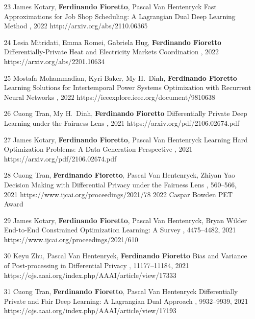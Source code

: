 \documentclass[localFont,alternative]{documentMETADATA}
\begin{document}
\begin{pubs}
	\confentryShort
	{23} %
	{{James Kotary}, {\bf Ferdinando Fioretto}, Pascal Van Hentenryck}
	{Fast Approximations for Job Shop Scheduling: A Lagrangian Dual Deep Learning Method}
	{\procAAAI, 2022}
	{http://arxiv.org/abs/2110.06365}

	\confentryShort
	{24} %
	{Lesia Mitridati, Emma Romei, Gabriela Hug, {\bf Ferdinando Fioretto}}
	{Differentially-Private Heat and Electricity Markets Coordination}
	{\procPMAPS, 2022}
	{https://arxiv.org/abs/2201.10634}

	\confentryShort
	{25} %
	{Mostafa Mohammadian, Kyri Baker, {My H.~Dinh}, {\bf Ferdinando Fioretto}}
	{Learning Solutions for Intertemporal Power Systems Optimization with Recurrent Neural Networks}
	{\procPMAPS, 2022}
	{https://ieeexplore.ieee.org/document/9810638}

	\confentryShort 
	{26} %
	{{Cuong Tran}, {My H.~Dinh}, {\bf Ferdinando Fioretto}}
	{Differentially Private Deep Learning under the Fairness Lens}
	{\procNeurIPS, 2021}
	{https://arxiv.org/pdf/2106.02674.pdf}

	\confentryShort 
	{27} %
	{{James Kotary}, {\bf Ferdinando Fioretto}, Pascal Van Hentenryck}
	{Learning Hard Optimization Problems: A Data Generation Perspective}
	{\procNeurIPS, 2021}
	{https://arxiv.org/pdf/2106.02674.pdf}

	\confentryShortAwd 
	{28} %
	{{Cuong Tran}, {\bf Ferdinando Fioretto}, Pascal Van Hentenryck, {Zhiyan Yao}}
	{Decision Making with Differential Privacy under the Fairness Lens}
	{\procIJCAI, 560--566, 2021}
	{https://www.ijcai.org/proceedings/2021/78}
	{2022 Caspar Bowden PET Award}

	\confentryShort 
	{29} %
	{{James Kotary}, {\bf Ferdinando Fioretto}, Pascal Van Hentenryck, Bryan Wilder}
	{End-to-End Constrained Optimization Learning: A Survey}
	{\procIJCAI, 4475--4482, 2021}
	{https://www.ijcai.org/proceedings/2021/610}

	\confentryShort 
	{30} %
	{Keyu Zhu, Pascal Van Hentenryck, {\bf Ferdinando Fioretto}}
	{Bias and Variance of Post-processing in Differential Privacy}
	{\procAAAI, 11177--11184, 2021}
	{https://ojs.aaai.org/index.php/AAAI/article/view/17333}

	\confentryShort 
	{31} %
	{{Cuong Tran}, {\bf Ferdinando Fioretto}, Pascal Van Hentenryck}
	{Differentially Private and Fair Deep Learning: A Lagrangian Dual Approach}
	{\procAAAI, 9932--9939, 2021}
	{https://ojs.aaai.org/index.php/AAAI/article/view/17193}



\end{pubs}
\end{document}
